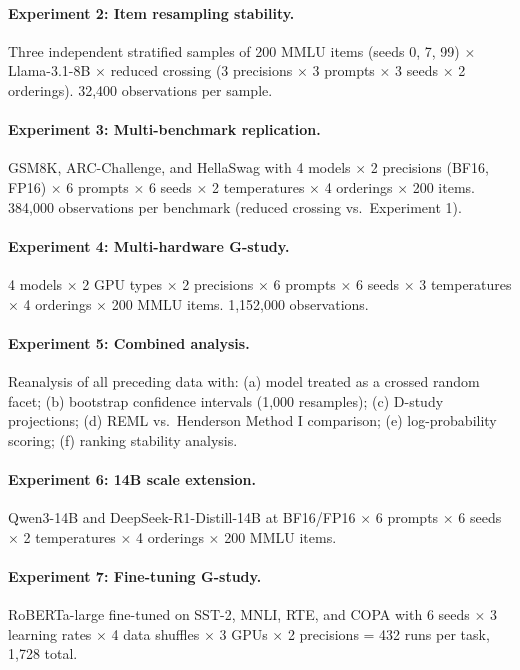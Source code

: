 \documentclass[11pt,twocolumn]{article}
\begin{document}
\paragraph{Experiment 2: Item resampling stability.} Three independent stratified samples of 200 MMLU items (seeds 0, 7, 99) $\times$ Llama-3.1-8B $\times$ reduced crossing (3 precisions $\times$ 3 prompts $\times$ 3 seeds $\times$ 2 orderings). 32,400 observations per sample.

\paragraph{Experiment 3: Multi-benchmark replication.} GSM8K, ARC-Challenge, and HellaSwag with 4 models $\times$ 2 precisions (BF16, FP16) $\times$ 6 prompts $\times$ 6 seeds $\times$ 2 temperatures $\times$ 4 orderings $\times$ 200 items. 384,000 observations per benchmark (reduced crossing vs.\ Experiment 1).

\paragraph{Experiment 4: Multi-hardware G-study.} 4 models $\times$ 2 GPU types $\times$ 2 precisions $\times$ 6 prompts $\times$ 6 seeds $\times$ 3 temperatures $\times$ 4 orderings $\times$ 200 MMLU items. 1,152,000 observations.

\paragraph{Experiment 5: Combined analysis.} Reanalysis of all preceding data with: (a) model treated as a crossed random facet; (b) bootstrap confidence intervals (1,000 resamples); (c) D-study projections; (d) REML vs.\ Henderson Method I comparison; (e) log-probability scoring; (f) ranking stability analysis.

\paragraph{Experiment 6: 14B scale extension.} Qwen3-14B and DeepSeek-R1-Distill-14B at BF16/FP16 $\times$ 6 prompts $\times$ 6 seeds $\times$ 2 temperatures $\times$ 4 orderings $\times$ 200 MMLU items.

\paragraph{Experiment 7: Fine-tuning G-study.} RoBERTa-large fine-tuned on SST-2, MNLI, RTE, and COPA with 6 seeds $\times$ 3 learning rates $\times$ 4 data shuffles $\times$ 3 GPUs $\times$ 2 precisions = 432 runs per task, 1,728 total.
\end{document}
